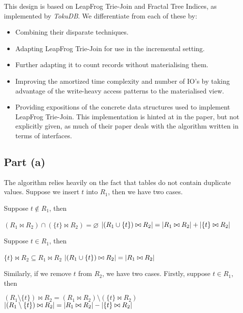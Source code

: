 This design is based on LeapFrog Trie-Join\cite{DBLP:journals/corr/abs-1210-0481} and Fractal Tree Indices, as implemented by \textit{TokuDB}\cite{kuszmaul2009fractal}. We differentiate from each of these by:
\begin{itemize}
  \item Combining their disparate techniques.
  \item Adapting LeapFrog Trie-Join for use in the incremental setting.
  \item Further adapting it to count records without materialising them.
  \item Improving the amortized time complexity and number of IO's by taking advantage of the write-heavy access patterns to the materialised view.
  \item Providing expositions of the concrete data structures used to implement LeapFrog Trie-Join. This implementation is hinted at in the paper, but not explicitly given, as much of their paper deals with the algorithm written in terms of interfaces.
\end{itemize}

\subsection{Part (a)}\label{sec:q-1-a}
The algorithm relies heavily on the fact that tables do not contain duplicate values. Suppose we insert $t$ into $R_1$, then we have two cases.

Suppose $t\notin R_1$, then
\begin{itemize}
  \step[\imps] $(R_1\bowtie R_2)\cap(\{t\}\bowtie R_2) = \varnothing$
  \step[\imps] $\lvert(R_1\cup\{t\})\bowtie R_2\rvert = \lvert R_1\bowtie R_2\rvert + \lvert\{t\}\bowtie R_2\rvert$
\end{itemize}

Suppose $t\in R_1$, then
\begin{itemize}
  \step[\imps] $\{t\}\bowtie R_2\subseteq R_1\bowtie R_2$
  \step[\imps] $\lvert(R_1\cup\{t\})\bowtie R_2\rvert = \lvert R_1\bowtie R_2\rvert$
\end{itemize}

Similarly, if we remove $t$ from $R_2$, we have two cases. Firstly, suppose $t\in R_1$, then
\begin{itemize}
  \step[\imps] $(R_1\setminus\{t\})\bowtie R_2 = (R_1\bowtie R_2)\setminus(\{t\}\bowtie R_2)$
  \step[\imps] $\lvert(R_1\setminus\{t\})\bowtie R_2\rvert = \lvert R_1\bowtie R_2\rvert - \lvert\{t\}\bowtie R_2\rvert$
\end{itemize}

